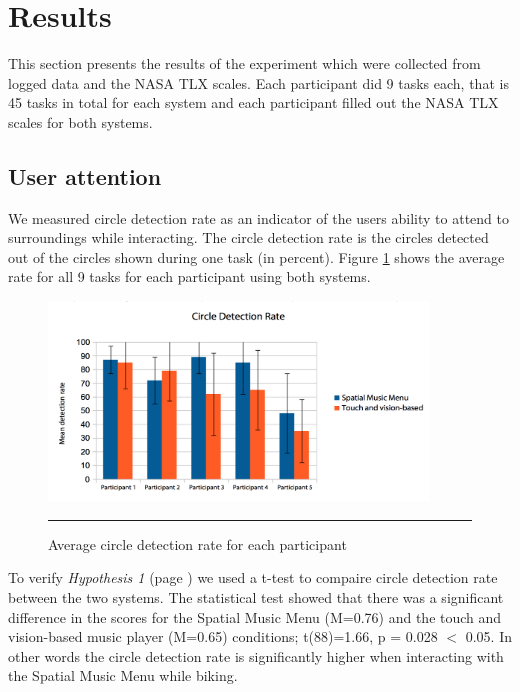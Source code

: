 \section{Results}
This section presents the results of the experiment which were collected from logged data and the NASA TLX scales. Each participant did 9 tasks each, that is 45 tasks in total for each system and each participant filled out the NASA TLX scales for both systems.

\subsection{User attention}
We measured circle detection rate as an indicator of the users ability to attend to surroundings while interacting. The circle detection rate is the circles detected out of the circles shown during one task (in percent). Figure \ref{fig:resultscircles} shows the average rate for all 9 tasks for each participant using both systems.

\begin{figure}[h]
	\centering
		\includegraphics[width=0.9\textwidth,height=\textheight,keepaspectratio]{./Figures/results_circledetections.png}
		\rule{35em}{1pt}
	\caption[Results Circle Detection Rate]{Average circle detection rate for each participant}
	\label{fig:resultscircles}
\end{figure}

To verify \textit{Hypothesis 1} (page \pageref{sec:evaluationhypothesis}) we used a t-test to compaire circle detection rate between the two systems. The statistical test showed that there was a significant difference in the scores for the Spatial Music Menu (M=0.76) and the touch and vision-based music player (M=0.65) conditions; t(88)=1.66, p = 0.028 $<$ 0.05. In other words the circle detection rate is significantly higher when interacting with the Spatial Music Menu while biking.

